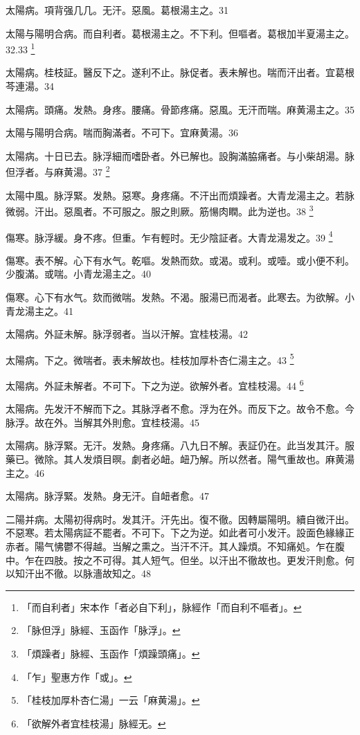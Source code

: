 太陽病。項背强几几。无汗。惡風。葛根湯主之。31

太陽与陽明合病。而自利{\khaaitp 者}。葛根湯主之。不下利。但嘔者。葛根加半夏湯主之。32.33
	\footnote{「而自利者」宋本作「者必自下利」，脉經作「而自利不嘔者」。}

太陽病。桂枝証。醫反下之。遂利不止。脉促者。表未解也。喘而汗出者。宜葛根芩連湯。34

太陽病。頭痛。发熱。身疼。腰痛。骨節疼痛。惡風。无汗而喘。麻黄湯主之。35

太陽与陽明合病。喘而胸滿者。不可下。宜麻黄湯。36

太陽病。十日已去。脉浮細而嗜卧者。外已解也。設胸滿脇痛者。与小柴胡湯。脉{\khaaitp 但}浮者。与麻黄湯。37
	\footnote{「脉但浮」脉經、玉函作「脉浮」。}

太陽中風。脉浮緊。发熱。惡寒。身疼痛。不汗出而煩躁者。大青龙湯主之。若脉微弱。汗出。惡風者。不可服之。服之則厥。筋愓肉瞤。此为逆也。38
	\footnote{「煩躁者」脉經、玉函作「煩躁頭痛」。}

傷寒。脉浮緩。身不疼。但重。乍有輕时。无少陰証者。大青龙湯发之。39
	\footnote{「乍」聖惠方作「或」。}

傷寒。表不解。心下有水气。乾嘔。发熱而欬。或渴。或利。或噎。或小便不利。少腹滿。或喘。小青龙湯主之。40

傷寒。心下有水气。欬而微喘。发熱。不渴。服湯已而渴者。此寒去。为欲解。小青龙湯主之。41

太陽病。外証未解。脉浮弱者。当以汗解。宜桂枝湯。42

太陽病。下之。微喘者。表未解故也。桂枝{\khaaitp 加厚朴杏仁}湯主之。43
	\footnote{「桂枝加厚朴杏仁湯」一云「麻黄湯」。}

太陽病。外証未解者。不可下。下之为逆。欲解外者。宜桂枝湯。44
	\footnote{「欲解外者宜桂枝湯」脉經无。}

太陽病。先发汗不解而下之。其脉浮者不愈。浮为在外。而反下之。故令不愈。今脉浮。故在外。当解其外則愈。宜桂枝湯。45

太陽病。脉浮緊。无汗。发熱。身疼痛。八九日不解。表証仍在。此当发其汗。服藥已。微除。其人发煩目暝。劇者必衄。衄乃解。所以然者。陽气重故也。麻黄湯主之。46

太陽病。脉浮緊。发熱。身无汗。自衄者愈。47

二陽并病。太陽初得病时。发其汗。汗先出{\khaaitp 。復}不徹。因轉屬陽明。續自微汗出。不惡寒。若太陽病証不罷者。不可下。下之为逆。如此者可小发汗。設面色緣緣正赤者。陽气怫鬱不得越。当解之熏之。当汗不汗。其人躁煩。不知痛処。乍在腹中。乍在四肢。按之不可得。其人短气。但坐。以汗出不徹故也。更发汗則愈。何以知汗出不徹。以脉濇故知之。48

